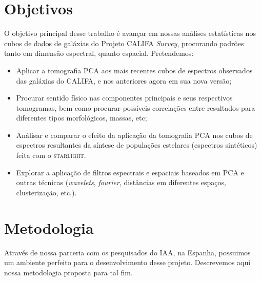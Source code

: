 \documentclass[a4paper,12pt]{article}
\def\starlight{\textsc{starlight}\xspace}      %
\begin{document}
\section{Objetivos}
\vspace{0.3cm}
O objetivo principal desse trabalho é avançar em nossas análises estatísticas nos cubos de dados de galáxias do Projeto CALIFA {\em Survey},
procurando padrões tanto em dimensão espectral, quanto espacial. Pretendemos:
\begin{itemize}
  \item Aplicar a tomografia PCA aos mais recentes cubos de espectros observados das galáxias do CALIFA, e nos anteriores agora em sua nova versão;
  \item Procurar sentido físico nas componentes principais e seus respectivos tomogramas, bem como procurar possíveis correlações entre resultados
  para diferentes tipos morfológicos, massas, etc;
  \item Análisar e comparar o efeito da aplicação da tomografia PCA nos cubos de espectros resultantes da síntese de populações estelares (espectros
  sintéticos) feita com o \starlight.
  \item Explorar a aplicação de filtros espectrais e espaciais baseados em PCA e outras técnicas ({\em wavelets}, {\em
  fourier}, distâncias em diferentes espaços, clusterização, etc.).
\end{itemize}

\section{Metodologia}
\vspace{0.3cm}
Através de nossa parceria com os pesquisados do IAA, na Espanha, possuimos um ambiente perfeito para o desenvolvimento desse projeto. Descrevemos aqui
nossa metodologia proposta para tal fim.
\end{document}
